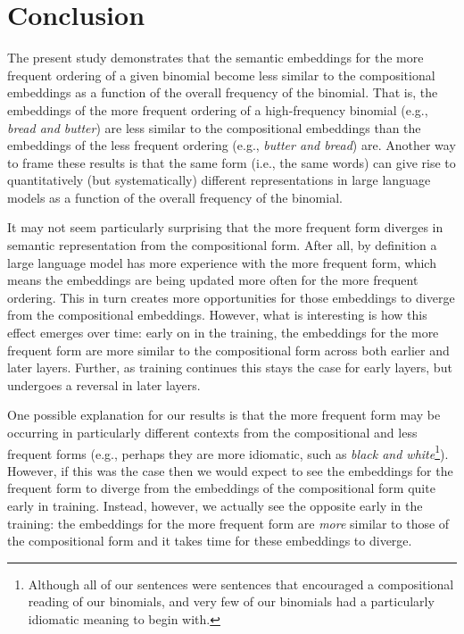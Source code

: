 \documentclass[
  12pt,
  letterpaper,
]{scrreprt}
\begin{document}
\section{Conclusion}\label{conclusion-2}

The present study demonstrates that the semantic embeddings for the more
frequent ordering of a given binomial become less similar to the
compositional embeddings as a function of the overall frequency of the
binomial. That is, the embeddings of the more frequent ordering of a
high-frequency binomial (e.g., \emph{bread and butter}) are less similar
to the compositional embeddings than the embeddings of the less frequent
ordering (e.g., \emph{butter and bread}) are. Another way to frame these
results is that the same form (i.e., the same words) can give rise to
quantitatively (but systematically) different representations in large
language models as a function of the overall frequency of the binomial.

It may not seem particularly surprising that the more frequent form
diverges in semantic representation from the compositional form. After
all, by definition a large language model has more experience with the
more frequent form, which means the embeddings are being updated more
often for the more frequent ordering. This in turn creates more
opportunities for those embeddings to diverge from the compositional
embeddings. However, what is interesting is how this effect emerges over
time: early on in the training, the embeddings for the more frequent
form are more similar to the compositional form across both earlier and
later layers. Further, as training continues this stays the case for
early layers, but undergoes a reversal in later layers.

One possible explanation for our results is that the more frequent form
may be occurring in particularly different contexts from the
compositional and less frequent forms (e.g., perhaps they are more
idiomatic, such as \emph{black and white}\footnote{Although all of our
  sentences were sentences that encouraged a compositional reading of
  our binomials, and very few of our binomials had a particularly
  idiomatic meaning to begin with.}). However, if this was the case then
we would expect to see the embeddings for the frequent form to diverge
from the embeddings of the compositional form quite early in training.
Instead, however, we actually see the opposite early in the training:
the embeddings for the more frequent form are \emph{more} similar to
those of the compositional form and it takes time for these embeddings
to diverge.
\end{document}
